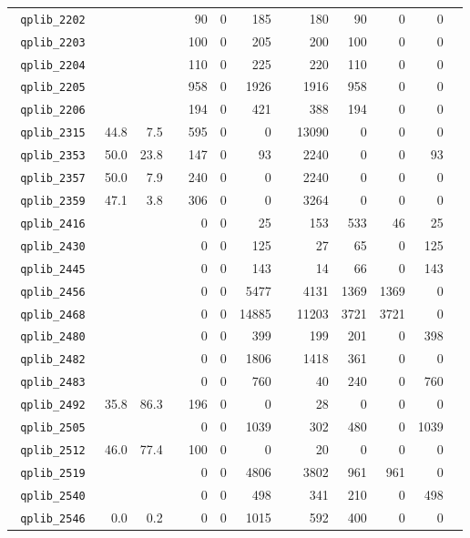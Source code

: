 {\begin{longtable}{lrrrrrrrrrrrr}
\texttt{ 	qplib\_2202	}	&		&		&	&	90	&	0	&	185	&	&	180	&	90	&	0	&	0	\\
\texttt{ 	qplib\_2203	}	&		&		&	&	100	&	0	&	205	&	&	200	&	100	&	0	&	0	\\
\texttt{ 	qplib\_2204	}	&		&		&	&	110	&	0	&	225	&	&	220	&	110	&	0	&	0	\\
\texttt{ 	qplib\_2205	}	&		&		&	&	958	&	0	&	1926	&	&	1916	&	958	&	0	&	0	\\
\texttt{ 	qplib\_2206	}	&		&		&	&	194	&	0	&	421	&	&	388	&	194	&	0	&	0	\\
\texttt{ 	qplib\_2315	}	&	44.8	&	7.5	&	&	595	&	0	&	0	&	&	13090	&	0	&	0	&	0	\\
\texttt{ 	qplib\_2353	}	&	50.0	&	23.8	&	&	147	&	0	&	93	&	&	2240	&	0	&	0	&	93	\\
\texttt{ 	qplib\_2357	}	&	50.0	&	7.9	&	&	240	&	0	&	0	&	&	2240	&	0	&	0	&	0	\\
\texttt{ 	qplib\_2359	}	&	47.1	&	3.8	&	&	306	&	0	&	0	&	&	3264	&	0	&	0	&	0	\\
\texttt{ 	qplib\_2416	}	&		&		&	&	0	&	0	&	25	&	&	153	&	533	&	46	&	25	\\
\texttt{ 	qplib\_2430	}	&		&		&	&	0	&	0	&	125	&	&	27	&	65	&	0	&	125	\\
\texttt{ 	qplib\_2445	}	&		&		&	&	0	&	0	&	143	&	&	14	&	66	&	0	&	143	\\
\texttt{ 	qplib\_2456	}	&		&		&	&	0	&	0	&	5477	&	&	4131	&	1369	&	1369	&	0	\\
\texttt{ 	qplib\_2468	}	&		&		&	&	0	&	0	&	14885	&	&	11203	&	3721	&	3721	&	0	\\
\texttt{ 	qplib\_2480	}	&		&		&	&	0	&	0	&	399	&	&	199	&	201	&	0	&	398	\\
\texttt{ 	qplib\_2482	}	&		&		&	&	0	&	0	&	1806	&	&	1418	&	361	&	0	&	0	\\
\texttt{ 	qplib\_2483	}	&		&		&	&	0	&	0	&	760	&	&	40	&	240	&	0	&	760	\\
\texttt{ 	qplib\_2492	}	&	35.8	&	86.3	&	&	196	&	0	&	0	&	&	28	&	0	&	0	&	0	\\
\texttt{ 	qplib\_2505	}	&		&		&	&	0	&	0	&	1039	&	&	302	&	480	&	0	&	1039	\\
\texttt{ 	qplib\_2512	}	&	46.0	&	77.4	&	&	100	&	0	&	0	&	&	20	&	0	&	0	&	0	\\
\texttt{ 	qplib\_2519	}	&		&		&	&	0	&	0	&	4806	&	&	3802	&	961	&	961	&	0	\\
\texttt{ 	qplib\_2540	}	&		&		&	&	0	&	0	&	498	&	&	341	&	210	&	0	&	498	\\
\texttt{ 	qplib\_2546	}	&	0.0	&	0.2	&	&	0	&	0	&	1015	&	&	592	&	400	&	0	&	0	\\

\end{longtable}}
